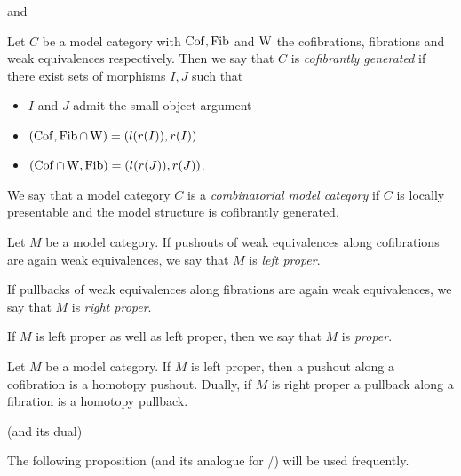 \begin{reference}
    \cite[Theorem 2.1.14]{hovey2007model} and \cite[Proposition 2.1.5]{cisinski_2019}
\end{reference}
\begin{definition}
    Let $C$ be a model category with $\operatorname{Cof},\operatorname{Fib}$ and $\operatorname{W}$ the cofibrations, fibrations and weak equivalences respectively.
    Then we say that $C$ is \emph{cofibrantly generated} if there exist sets of morphisms $I,J$ such that
    \begin{itemize}
        \item $I$ and $J$ admit the small object argument
        \item $(\operatorname{Cof},\operatorname{Fib}\cap\operatorname{W})=(l(r(I)),r(I))$
        \item $(\operatorname{Cof}\cap\operatorname{W},\operatorname{Fib})=(l(r(J)),r(J))$.
    \end{itemize} 
\end{definition}
\begin{definition}
    We say that a model category $C$ is a \emph{combinatorial model category} if $C$ is locally presentable and the model structure is cofibrantly generated.
\end{definition} %
\begin{definition}[Properness] %
    Let $M$ be a model category.
    If pushouts of weak equivalences along cofibrations are again weak equivalences, we say that $M$ is \emph{left proper}.
    
    If pullbacks of weak equivalences along fibrations are again weak equivalences, we say that $M$ is \emph{right proper}.
    
    If $M$ is left proper as well as left proper, then we say that $M$ is \emph{proper}.
\end{definition}
\begin{prop}
    Let $M$ be a model category.
    If $M$ is left proper, then a pushout along a cofibration is a homotopy pushout.
    Dually, if $M$ is right proper a pullback along a fibration is a homotopy pullback.
    \begin{reference}
        \cite[Proposition A.2.4.4]{HTT} (and its dual)
    \end{reference}
\end{prop}
The following proposition (and its analogue for \inftycats/) will be used frequently.
